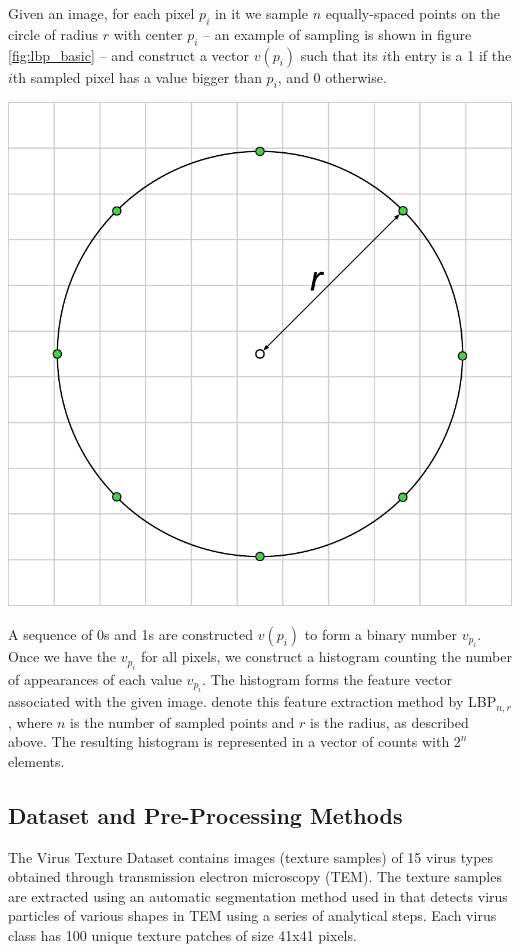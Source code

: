 \begin{multicols}{2}
Given an image, for each pixel $p_i$ in it we sample $n$ equally-spaced points on the circle of radius $r$ with center $p_i$ -- an example of sampling is shown in figure \ref{fig:lbp_basic} -- and construct a vector $v(p_i)$ such that its $i$th entry is a 1 if the $i$th sampled pixel has a value bigger than $p_i$, and 0 otherwise. 
\begin{Figure}
	\centering
	\includegraphics[width=0.5\linewidth]{images/lbp_basic.pdf}
	\label{fig:lbp_basic}
\end{Figure}
A sequence of 0s and 1s are constructed $v(p_i)$ to form a binary number $v_{p_i}$. Once we have the $v_{p_i}$ for all pixels, we construct a histogram counting the number of appearances of each value $v_{p_i}$. The histogram forms the feature vector associated with the given image. \citet{kylberg2011virus} denote this feature extraction method by LBP$_{n, r}$, where $n$ is the number of sampled points and $r$ is the radius, as described above. The resulting histogram is represented in a vector of counts with $2^n$ elements. 

\subsection{Dataset and Pre-Processing Methods}
\label{text:dataset}
The Virus Texture Dataset contains images (texture samples) of 15 virus types obtained through transmission electron microscopy (TEM). The texture samples are extracted using an automatic segmentation method used in \citet{JMI:JMI3556} that detects virus particles of various shapes in TEM using a series of analytical steps. Each virus class has 100 unique texture patches of size 41x41 pixels.


\end{multicols}
